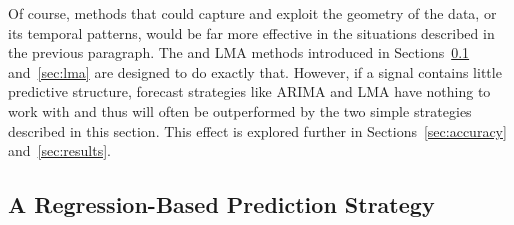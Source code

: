 Of course, methods that could capture and exploit the geometry of the
data, or its temporal patterns, would be far more effective in the
situations described in the previous paragraph.  The \arima and LMA
methods introduced in Sections~\ref{sec:arima} and~\ref{sec:lma} are
designed to do exactly that.
However, if a signal contains little predictive structure, forecast
strategies like ARIMA and LMA have nothing to work with and thus will
often be outperformed by the two simple strategies described in this
section.  This effect is explored further in Sections~\ref{sec:accuracy}
and~\ref{sec:results}.


\subsection{A Regression-Based Prediction Strategy}
\label{sec:arima}





